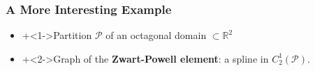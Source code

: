 \documentclass{beamer}
\theoremstyle{definition}
\theoremstyle{remark}
\newcommand{\PC}{\mathcal{P}}
\newcommand{\R}{\mathbb{R}}
\begin{document}
\begin{frame}
\end{frame}

\begin{frame}
\frametitle{A More Interesting Example}

\vspace{-150 pt}

\begin{overlayarea}{\textwidth}{40 pt}

\begin{center}
\end{center}

\vspace{-30 pt}

\begin{itemize}
\item \onslide+<1->{Partition $\PC$ of an octagonal domain $\subset\R^2$}

\item \onslide+<2->{Graph of the \textbf{Zwart-Powell element}: a spline in $C^1_2(\PC)$.}


\end{itemize}
\end{overlayarea}
\end{frame}
\end{document}
